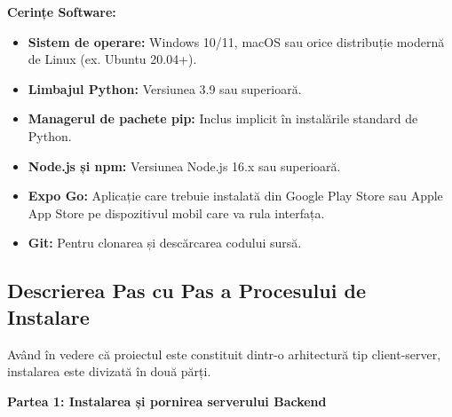 \textbf{Cerințe Software:}
\begin{itemize}
    \item \textbf{Sistem de operare:} Windows 10/11, macOS sau orice distribuție modernă de Linux (ex. Ubuntu 20.04+).
    \item \textbf{Limbajul Python:} Versiunea 3.9 sau superioară.
    \item \textbf{Managerul de pachete pip:} Inclus implicit în instalările standard de Python.
    \item \textbf{Node.js și npm:} Versiunea Node.js 16.x sau superioară.
    \item \textbf{Expo Go:} Aplicație care trebuie instalată din Google Play Store sau Apple App Store pe dispozitivul mobil care va rula interfața.
    \item \textbf{Git:} Pentru clonarea și descărcarea codului sursă.
\end{itemize}

\subsection{Descrierea Pas cu Pas a Procesului de Instalare}

Având în vedere că proiectul este constituit dintr-o arhitectură tip client-server, instalarea este divizată în două părți.

\textbf{Partea 1: Instalarea și pornirea serverului Backend}

